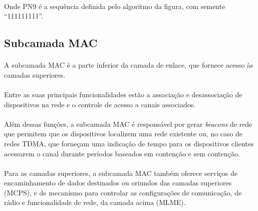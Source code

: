 \paragraph{} Onde PN9 é a sequência definida pelo algoritmo da figura, com semente “111111111”.


\subsection{Subcamada MAC}
\paragraph{} A subcamada MAC é a parte inferior da camada de enlace, que fornece acesso às camadas superiores.

\paragraph{} Entre as suas principais funcionalidades estão a associação e desassociação de dispositivos na rede e o controle de acesso a canais associados. 

\paragraph{}Além dessas funções, a subcamada MAC é responsável por gerar \textit{beacons} de rede que permitem que os dispositivos localizem uma rede existente ou, no caso de redes TDMA, que forneçam uma indicação de tempo para os dispositivos clientes acessarem o canal durante períodos baseados em contenção e sem contenção.

\paragraph{} Para as camadas superiores, a subcamada MAC também oferece serviços de encaminhamento de dados destinados ou oriundos das camadas superiores (MCPS), e de mecanismo para controlar as configurações de comunicação, de rádio e funcionalidade de rede, da camada acima (MLME)\citep{IEEE2016}.



